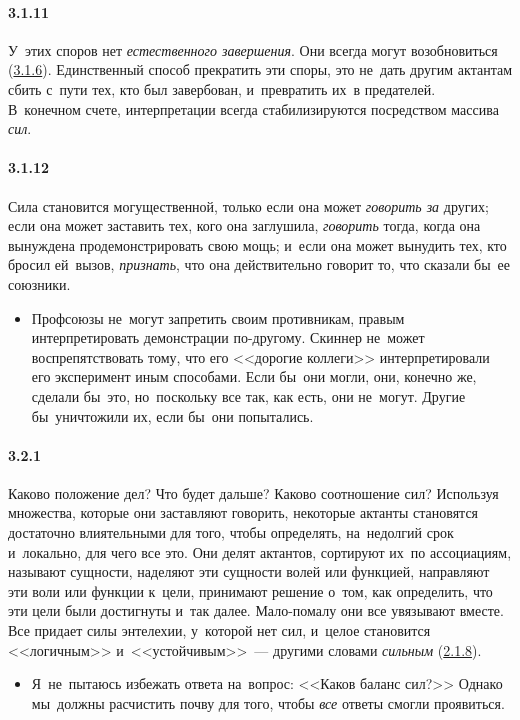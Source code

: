 \paragraph{3.1.11}\hypertarget{par:3.1.11}{} У~этих споров нет {\itshape естественного завершения}. Они всегда могут возобновиться (\hyperlink{par:3.1.6}{3.1.6}). Единственный способ прекратить эти споры, это не~дать другим актантам сбить с~пути тех, кто был завербован, и~превратить их~в предателей. В~конечном счете, интерпретации всегда стабилизируются посредством массива {\itshape сил}.

\paragraph{3.1.12}\hypertarget{par:3.1.12}{} Сила становится могущественной, только если она может {\itshape говорить за} других; если она может заставить тех, кого она заглушила, {\itshape говорить} тогда, когда она вынуждена продемонстрировать свою мощь; и~если она может вынудить тех, кто бросил ей~вызов, {\itshape признать}, что она действительно говорит то, что сказали бы~ее союзники. 
	\begin{itemize}
	\item 
	Профсоюзы не~могут запретить своим противникам, правым интерпретировать демонстрации по-другому. Скиннер не~может воспрепятствовать тому, что его <<дорогие коллеги>> интерпретировали его эксперимент иным способами. Если бы~они могли, они, конечно же, сделали бы~это, но~поскольку все так, как есть, они не~могут. Другие бы~уничтожили их, если бы~они попытались.
	\end{itemize}

\paragraph{3.2.1}\hypertarget{par:3.2.1}{} Каково положение дел? Что будет дальше? Каково соотношение сил? Используя множества, которые они заставляют говорить, некоторые актанты становятся достаточно влиятельными для того, чтобы определять, на~недолгий срок и~локально, для чего все это. Они делят актантов, сортируют их~по ассоциациям, называют сущности, наделяют эти сущности волей или функцией, направляют эти воли или функции к~цели, принимают решение о~том, как определить, что эти цели были достигнуты и~так далее. Мало-помалу они все увязывают вместе. Все придает силы энтелехии, у~которой нет сил, и~целое становится <<логичным>> и~<<устойчивым>>~--- другими словами {\itshape сильным} (\hyperlink{par:2.1.8}{2.1.8}).
	\begin{itemize}
	\item 
 Я~не~пытаюсь избежать ответа на~вопрос: <<Каков баланс сил?>> Однако мы~должны расчистить почву для того, чтобы {\itshape все} ответы смогли проявиться.
	\end{itemize}

